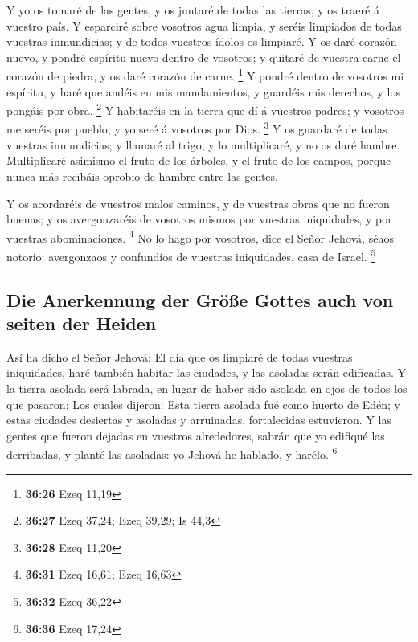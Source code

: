  Y yo os tomaré de las gentes, y os juntaré de todas las
tierras, y os traeré á vuestro país.  Y esparciré sobre
vosotros agua limpia, y seréis limpiados de todas vuestras inmundicias;
y de todos vuestros ídolos os limpiaré.  Y os daré
corazón nuevo, y pondré espíritu nuevo dentro de vosotros; y quitaré de
vuestra carne el corazón de piedra, y os daré corazón de carne.
\footnote{\textbf{36:26} Ezeq 11,19}  Y pondré dentro de
vosotros mi espíritu, y haré que andéis en mis mandamientos, y guardéis
mis derechos, y los pongáis por obra. \footnote{\textbf{36:27} Ezeq
  37,24; Ezeq 39,29; Is 44,3}  Y habitaréis en la tierra
que dí á vuestros padres; y vosotros me seréis por pueblo, y yo seré á
vosotros por Dios. \footnote{\textbf{36:28} Ezeq 11,20} 
Y os guardaré de todas vuestras inmundicias; y llamaré al trigo, y lo
multiplicaré, y no os daré hambre.  Multiplicaré asimismo
el fruto de los árboles, y el fruto de los campos, porque nunca más
recibáis oprobio de hambre entre las gentes.

 Y os acordaréis de vuestros malos caminos, y de vuestras
obras que no fueron buenas; y os avergonzaréis de vosotros mismos por
vuestras iniquidades, y por vuestras abominaciones. \footnote{\textbf{36:31}
  Ezeq 16,61; Ezeq 16,63}  No lo hago por vosotros, dice
el Señor Jehová, séaos notorio: avergonzaos y confundíos de vuestras
iniquidades, casa de Israel. \footnote{\textbf{36:32} Ezeq 36,22}

\hypertarget{die-anerkennung-der-gruxf6uxdfe-gottes-auch-von-seiten-der-heiden}{%
\subsection{Die Anerkennung der Größe Gottes auch von seiten der
Heiden}\label{die-anerkennung-der-gruxf6uxdfe-gottes-auch-von-seiten-der-heiden}}

 Así ha dicho el Señor Jehová: El día que os limpiaré de
todas vuestras iniquidades, haré también habitar las ciudades, y las
asoladas serán edificadas.  Y la tierra asolada será
labrada, en lugar de haber sido asolada en ojos de todos los que
pasaron;  Los cuales dijeron: Esta tierra asolada fué
como huerto de Edén; y estas ciudades desiertas y asoladas y arruinadas,
fortalecidas estuvieron.  Y las gentes que fueron dejadas
en vuestros alrededores, sabrán que yo edifiqué las derribadas, y planté
las asoladas: yo Jehová he hablado, y harélo. \footnote{\textbf{36:36}
  Ezeq 17,24}

